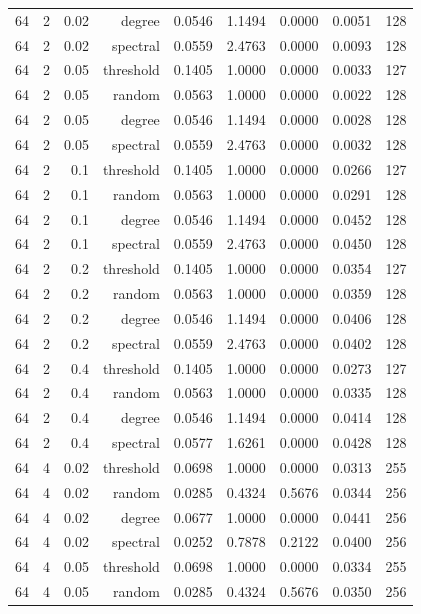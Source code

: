 \begin{table}[t]
\begin{tabular}{lrrrrrrrr}
64 & 2 & 0.02 & degree & 0.0546 & 1.1494 & 0.0000 & 0.0051 & 128 \\
64 & 2 & 0.02 & spectral & 0.0559 & 2.4763 & 0.0000 & 0.0093 & 128 \\
64 & 2 & 0.05 & threshold & 0.1405 & 1.0000 & 0.0000 & 0.0033 & 127 \\
64 & 2 & 0.05 & random & 0.0563 & 1.0000 & 0.0000 & 0.0022 & 128 \\
64 & 2 & 0.05 & degree & 0.0546 & 1.1494 & 0.0000 & 0.0028 & 128 \\
64 & 2 & 0.05 & spectral & 0.0559 & 2.4763 & 0.0000 & 0.0032 & 128 \\
64 & 2 & 0.1 & threshold & 0.1405 & 1.0000 & 0.0000 & 0.0266 & 127 \\
64 & 2 & 0.1 & random & 0.0563 & 1.0000 & 0.0000 & 0.0291 & 128 \\
64 & 2 & 0.1 & degree & 0.0546 & 1.1494 & 0.0000 & 0.0452 & 128 \\
64 & 2 & 0.1 & spectral & 0.0559 & 2.4763 & 0.0000 & 0.0450 & 128 \\
64 & 2 & 0.2 & threshold & 0.1405 & 1.0000 & 0.0000 & 0.0354 & 127 \\
64 & 2 & 0.2 & random & 0.0563 & 1.0000 & 0.0000 & 0.0359 & 128 \\
64 & 2 & 0.2 & degree & 0.0546 & 1.1494 & 0.0000 & 0.0406 & 128 \\
64 & 2 & 0.2 & spectral & 0.0559 & 2.4763 & 0.0000 & 0.0402 & 128 \\
64 & 2 & 0.4 & threshold & 0.1405 & 1.0000 & 0.0000 & 0.0273 & 127 \\
64 & 2 & 0.4 & random & 0.0563 & 1.0000 & 0.0000 & 0.0335 & 128 \\
64 & 2 & 0.4 & degree & 0.0546 & 1.1494 & 0.0000 & 0.0414 & 128 \\
64 & 2 & 0.4 & spectral & 0.0577 & 1.6261 & 0.0000 & 0.0428 & 128 \\
64 & 4 & 0.02 & threshold & 0.0698 & 1.0000 & 0.0000 & 0.0313 & 255 \\
64 & 4 & 0.02 & random & 0.0285 & 0.4324 & 0.5676 & 0.0344 & 256 \\
64 & 4 & 0.02 & degree & 0.0677 & 1.0000 & 0.0000 & 0.0441 & 256 \\
64 & 4 & 0.02 & spectral & 0.0252 & 0.7878 & 0.2122 & 0.0400 & 256 \\
64 & 4 & 0.05 & threshold & 0.0698 & 1.0000 & 0.0000 & 0.0334 & 255 \\
64 & 4 & 0.05 & random & 0.0285 & 0.4324 & 0.5676 & 0.0350 & 256 \\

\end{tabular}
\end{table}
